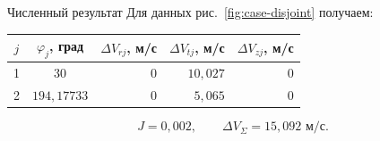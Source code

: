 \begin{explanation}{Численный результат}
Для данных рис.~\ref{fig:case-disjoint} получаем:
\begin{center}\begin{tabular}{cc|rrr}
$j$ & $\varphi_j$, град & $\Delta V_{rj}$, м/с & $\Delta V_{tj}$, м/с & $\Delta V_{zj}$, м/с\\\hline
1 & $30$ & $0$ & $10{,}027$ & $0$\\
2 & $194{,}17733$ & $0$ & $5{,}065$ & $0$\\
\end{tabular}\end{center}
\[ J=0{,}002,\qquad \Delta V_\Sigma=15{,}092\text{ м/с}.\]
\end{explanation}
